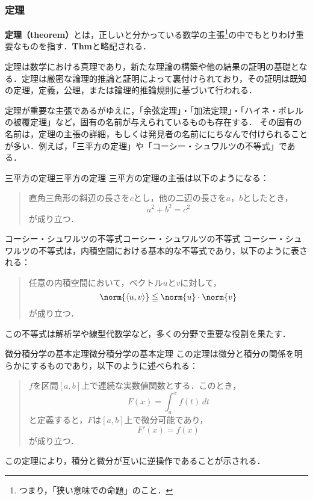 \documentclass[a4paper,11pt]{ltjsarticle}
\renewcommand{\emph}[1]{\textbf{#1}}
\renewcommand{\leq}{\leqq}
\begin{document}
\subsubsection{定理}

\emph{定理（theorem）}とは，正しいと分かっている数学の主張\footnote{つまり，「狭い意味での命題」のこと．}の中でもとりわけ重要なものを指す．\textbf{Thm}と略記される．


定理は数学における真理であり，新たな理論の構築や他の結果の証明の基礎となる．定理は厳密な論理的推論と証明によって裏付けられており，その証明は既知の定理，定義，公理，または論理的推論規則に基づいて行われる．

定理が重要な主張であるがゆえに，「余弦定理」・「加法定理」・「ハイネ・ボレルの被覆定理」など，固有の名前が与えられているものも存在する．
その固有の名前は，定理の主張の詳細，もしくは発見者の名前ににちなんで付けられることが多い．例えば，「三平方の定理」や「コーシー・シュワルツの不等式」である．

\begin{example}{三平方の定理}{三平方の定理}
	三平方の定理の主張は以下のようになる：
	\begin{quotation}
    直角三角形の斜辺の長さを$c$とし，他の二辺の長さを$a$，$b$としたとき，
    \[
        a^2+b^2=c^2
    \]
    が成り立つ．
\end{quotation}
\end{example}
  
  \begin{example}{コーシー・シュワルツの不等式}{コーシー・シュワルツの不等式}
  コーシー・シュワルツの不等式は，内積空間における基本的な不等式であり，以下のように表される：
  \begin{quotation}
  任意の内積空間において，ベクトル$u$と$v$に対して，
  \[
  \norm{\langle u, v \rangle} \leq \norm{u} \cdot \norm{v}
  \]
  が成り立つ．
  \end{quotation}
  この不等式は解析学や線型代数学など，多くの分野で重要な役割を果たす．
  \end{example}
  
  \begin{example}{微分積分学の基本定理}{微分積分学の基本定理}
  この定理は微分と積分の関係を明らかにするものであり，以下のように述べられる：
  \begin{quotation}
  $f$を区間$[a, b]$上で連続な実数値関数とする．このとき，
  \[
  F(x) = \int_a^x f(t) \, dt
  \]
  と定義すると，$F$は$[a, b]$上で微分可能であり，
  \[
  F'(x) = f(x)
  \]
  が成り立つ．
  \end{quotation}
  この定理により，積分と微分が互いに逆操作であることが示される．
  \end{example}
\end{document}
